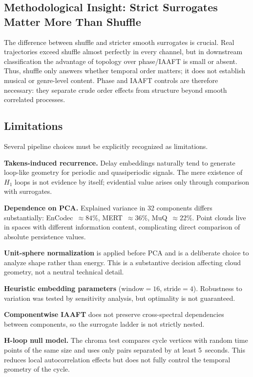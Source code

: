 \subsection{Methodological Insight: Strict Surrogates Matter More Than Shuffle}

The difference between shuffle and stricter smooth surrogates is crucial. Real trajectories exceed shuffle almost perfectly in every channel, but in downstream classification the advantage of topology over phase/IAAFT is small or absent. Thus, shuffle only answers whether temporal order matters; it does not establish musical or genre-level content. Phase and IAAFT controls are therefore necessary: they separate crude order effects from structure beyond smooth correlated processes.

\subsection{Limitations}

Several pipeline choices must be explicitly recognized as limitations.

\textbf{Takens-induced recurrence.} Delay embeddings naturally tend to generate loop-like geometry for periodic and quasiperiodic signals. The mere existence of $H_1$ loops is not evidence by itself; evidential value arises only through comparison with surrogates.

\textbf{Dependence on PCA.} Explained variance in 32 components differs substantially: EnCodec~$\approx 84\%$, MERT~$\approx 36\%$, MuQ~$\approx 22\%$. Point clouds live in spaces with different information content, complicating direct comparison of absolute persistence values.

\textbf{Unit-sphere normalization} is applied before PCA and is a deliberate choice to analyze shape rather than energy. This is a substantive decision affecting cloud geometry, not a neutral technical detail.

\textbf{Heuristic embedding parameters} (window${}=16$, stride${}=4$). Robustness to variation was tested by sensitivity analysis, but optimality is not guaranteed.

\textbf{Componentwise IAAFT} does not preserve cross-spectral dependencies between components, so the surrogate ladder is not strictly nested.

\textbf{H-loop null model.} The chroma test compares cycle vertices with random time points of the same size and uses only pairs separated by at least 5~seconds. This reduces local autocorrelation effects but does not fully control the temporal geometry of the cycle.

